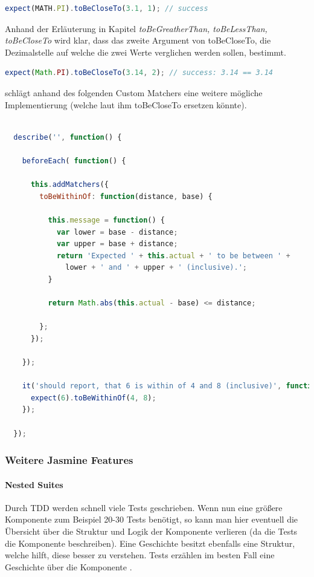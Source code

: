 \begin{lstlisting}[language=JavaScript]
expect(MATH.PI).toBeCloseTo(3.1, 1); // success
\end{lstlisting}

Anhand der Erläuterung in Kapitel \textit{toBeGreatherThan, toBeLessThan, toBeCloseTo} wird klar, dass das zweite Argument von toBeCloseTo, die Dezimalstelle auf welche die zwei Werte verglichen werden sollen, bestimmt.

\begin{lstlisting}[language=JavaScript]
expect(Math.PI).toBeCloseTo(3.14, 2); // success: 3.14 == 3.14
\end{lstlisting}

\cite[21]{Hahn:2013} schlägt anhand des folgenden Custom Matchers eine weitere mögliche Implementierung (welche laut ihm toBeCloseTo ersetzen könnte).

\begin{lstlisting}[language=JavaScript]

  describe('', function() {

    beforeEach( function() {

      this.addMatchers({
        toBeWithinOf: function(distance, base) {

          this.message = function() {
            var lower = base - distance;
            var upper = base + distance;
            return 'Expected ' + this.actual + ' to be between ' + 
              lower + ' and ' + upper + ' (inclusive).';
          }

          return Math.abs(this.actual - base) <= distance;

        };
      });

    });

    it('should report, that 6 is within of 4 and 8 (inclusive)', function() {
      expect(6).toBeWithinOf(4, 8);
    });

  });

\end{lstlisting} 

\subsubsection{Weitere Jasmine Features}
\paragraph{Nested Suites}
Durch TDD werden schnell viele Tests geschrieben. Wenn nun eine größere Komponente zum Beispiel 20-30 Tests benötigt, so kann man hier eventuell die Übersicht über die Struktur und Logik der Komponente verlieren (da die Tests die Komponente beschreiben). Eine Geschichte besitzt ebenfalls eine Struktur, welche hilft, diese besser zu verstehen. Tests erzählen im besten Fall eine Geschichte über die Komponente \autocite{Beck:2003}.

